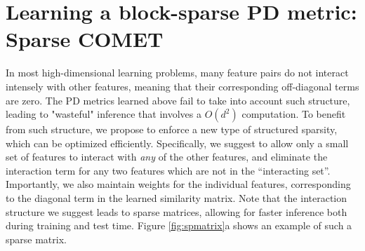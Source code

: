\documentclass[twoside,11pt]{article}
\newcommand{\ignore}[1]{}
\begin{document}
\section{Learning a block-sparse PD metric: Sparse COMET}\vskip -5pt
\ignore{The PD metric learned above can be used for extracting new features, but one is often interested to maintain interpretability with \emph{feature selection}: learn a metric which only relies on a small subset of the original feature set, or a small subset of feature pairs. To that end, we develop a method for learning feature-sparse PD metrics, using a block-coordinate descent method that maintains the PD property during training.}

\ignore{
The PD metric learned above does not take into account possible structures often found in feature interactions. }

In most high-dimensional learning problems, many feature pairs do not interact intensely with other features, meaning that their corresponding off-diagonal terms are zero. The PD metrics learned above fail to take into account such structure, leading to  "wasteful" inference that involves a $O(d^2)$ computation. To benefit from such structure, we propose to enforce a new type of structured sparsity, which can be optimized efficiently. Specifically, we suggest to allow only a small set of features to interact with \emph{any} of the other features, and eliminate the interaction term for any two features which are not in the ``interacting set''. Importantly, we also maintain weights for the individual features, corresponding to the diagonal term in the learned similarity matrix. Note that the interaction structure we suggest leads to sparse matrices, allowing for faster inference both during training and test time. 
Figure \ref{fig:spmatrix}a shows an example of such a sparse matrix.
\end{document}
